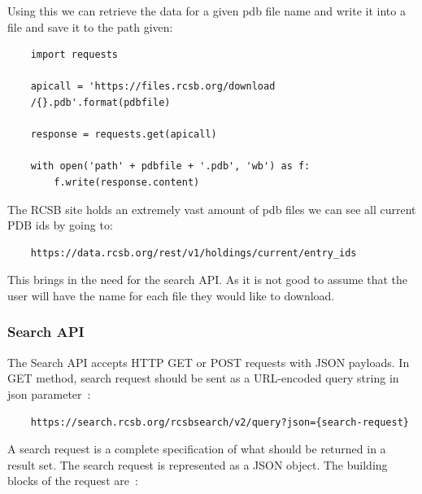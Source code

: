 \documentclass[]{final_report}
\begin{document}
Using this we can retrieve the data for a given pdb file name and write it into a file and save it to the path given:

\begin{lstlisting}
    import requests

    apicall = 'https://files.rcsb.org/download
    /{}.pdb'.format(pdbfile)

    response = requests.get(apicall)

    with open('path' + pdbfile + '.pdb', 'wb') as f:
        f.write(response.content)

\end{lstlisting}

The RCSB site holds an extremely vast amount of pdb files we can see all current PDB ids by going to:

\begin{lstlisting}
    https://data.rcsb.org/rest/v1/holdings/current/entry_ids
\end{lstlisting}

This brings in the need for the search API. As it is not good to assume that the user will have the name for each file they would like to download.

\clearpage

\subsubsection{Search API}

The Search API accepts HTTP GET or POST requests with JSON payloads. In GET method, search request should be sent as a URL-encoded query string in json parameter~\cite{burley_rcsb_2019}\cite{rose_rcsb_2021}: 

\begin{lstlisting}
    https://search.rcsb.org/rcsbsearch/v2/query?json={search-request}
\end{lstlisting}

A search request is a complete specification of what should be returned in a result set. The search request is represented as a JSON object. The building blocks of the request are~\cite{burley_rcsb_2019}\cite{rose_rcsb_2021}:

\vspace{40px}
\end{document}
